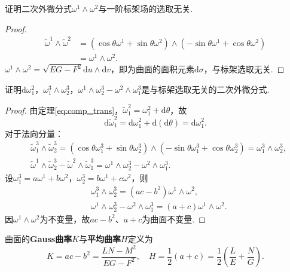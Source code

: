 \documentclass[../../main.tex]{subfiles}%
\begin{document}
\begin{example}
证明二次外微分式$\omega^1\land\omega^2$与一阶标架场的选取无关.
\begin{proof}

\begin{align*}
\tilde{\omega}^1\land\tilde{\omega}^2 &= (\cos\theta\omega^1+\sin\theta\omega^2)\land(-\sin\theta\omega^1+\cos\theta\omega^2) \\
&= \omega^1\land\omega^2.
\end{align*}
$\omega^1\land\omega^2=\sqrt{EG-F^2}\mathrm{d}u\land\mathrm{d}v$，即为曲面的面积元素$\mathrm{d}\sigma$，与标架选取无关.

\end{proof}
\end{example}

\begin{example}
证明$\mathrm{d}\omega_1^2$，$\omega_1^3\land\omega_2^3$，$\omega^1\land\omega_2^3-\omega^2\land\omega_1^3$是与标架选取无关的二次外微分式.
\begin{proof}

由定理\eqref{eq:comp_trans}，$\tilde{\omega}_1^2=\omega_1^2+\mathrm{d}\theta$，故
$$\mathrm{d}\tilde{\omega}_1^2=\mathrm{d}\omega_1^2+\mathrm{d}(\mathrm{d}\theta)=\mathrm{d}\omega_1^2.$$
对于法向分量：
\begin{align*}
&\tilde{\omega}_1^3\land\tilde{\omega}_2^3 = (\cos\theta\omega_1^3+\sin\theta\omega_2^3)\land(-\sin\theta\omega_1^3+\cos\theta\omega_2^3) = \omega_1^3\land\omega_2^3, \\
&\tilde{\omega}^1\land\tilde{\omega}_2^3-\tilde{\omega}^2\land\tilde{\omega}_1^3 = \omega^1\land\omega_2^3-\omega^2\land\omega_1^3.
\end{align*}
设$\omega_1^3=a\omega^1+b\omega^2$，$\omega_2^3=b\omega^1+c\omega^2$，则
\begin{align*}
&\omega_1^3\land\omega_2^3 = (ac-b^2)\omega^1\land\omega^2, \\
&\omega^1\land\omega_2^3-\omega^2\land\omega_1^3 = (a+c)\omega^1\land\omega^2.
\end{align*}
因$\omega^1\land\omega^2$为不变量，故$ac-b^2$、$a+c$为曲面不变量.

\end{proof}
\end{example}

\begin{definition}
曲面的\textbf{Gauss曲率}$K$与\textbf{平均曲率}$H$定义为
$$K=ac-b^2=\frac{LN-M^2}{EG-F^2},\quad H=\frac{1}{2}(a+c)=\frac{1}{2}\left(\frac{L}{E}+\frac{N}{G}\right).$$
\end{definition}
\end{document}
